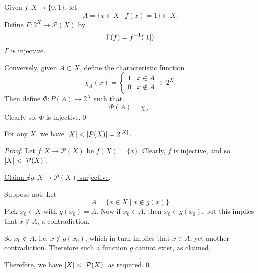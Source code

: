 \documentclass[notoc,notitlepage]{tufte-book}
\begin{document}
\begin{solution}
  Given $f : X \to \{ 0, 1 \}$, let
  \begin{equation*}
    A = \{ x \in X \mid f(x) = 1 \} \subset X.
  \end{equation*}
  Define $\Gamma : 2^X \to \mathcal{P}(X)$ by
  \begin{equation*}
    \Gamma(f) = f^{-1}(\left|1\right|)
  \end{equation*}
  $\Gamma$ is injective.

  Conversely, given $A \subset X$, define the characteristic function
  \begin{equation*}
    \chi_A(x) = \begin{cases}
      1 & x \in A \\
      0 & x \notin A
    \end{cases} \in 2^X.
  \end{equation*}
  Then define $\Phi : P(A) \to 2^X$ such that
  \begin{equation*}
    \Phi(A) = \chi_A.
  \end{equation*}
  Clearly so, $\Phi$ is injective.\qed
\end{solution}

\begin{thm}
\label{thm:russell_s_paradox}
  For any $X$, we have $\left|X\right| < \left|\mathcal{P}(X)\right| = 2^{\left|X\right|}$.
\end{thm}

\begin{proof}
  Let $f : X \to \mathcal{P}(X)$ be $f(X) = \{ x \}$. Clearly, $f$ is injective, and so $\left|X\right| < \left|\mathcal{P}(X)\right|$.

  \noindent\underline{Claim: $\nexists g : X \to \mathcal{P}(X)$ surjective}.

  Suppose not. Let
  \begin{equation*}
     A = \{ x \in X \mid x \notin g(x) \}
  \end{equation*}
  Pick $x_0 \in X$ with $g(x_0) = A$. Now if $x_0 \in A$, then $x_0 \in g(x_0)$, but this implies that $x \notin A$, a contradiction.

  So $x_0 \notin A$, i.e. $x \notin g(x_0)$, which in turn implies that $x \in A$, yet another contradiction. Therefore such a function $g$ cannot exist, as claimed.

  Therefore, we have $\left|X\right| < \left|\mathcal{P}(X)\right|$ as required.\qed
\end{proof}
\end{document}
